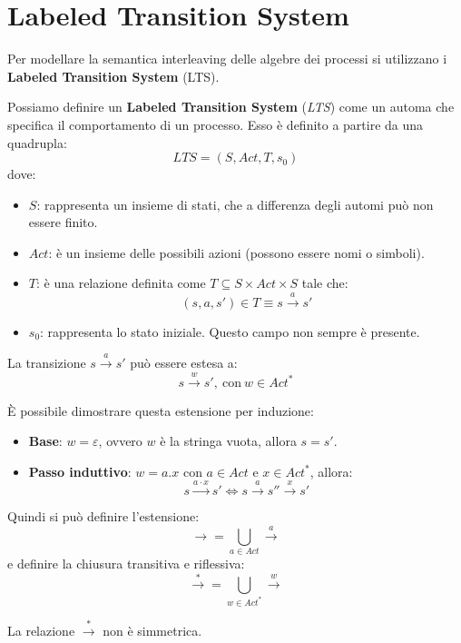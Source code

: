 \section{Labeled Transition System}
Per modellare la semantica interleaving delle algebre dei processi si utilizzano
i \textbf{Labeled Transition System} (LTS).
\begin{definizione}
    Possiamo definire un \textbf{Labeled Transition System} (\textit{LTS}) come
    un automa che specifica il comportamento di un processo. Esso è definito a
    partire da una quadrupla:
    \begin{equation}
        LTS = (S, Act, T, s_0)
    \end{equation}
    dove:
    \begin{itemize}
        \item \textbf{$S$}: rappresenta un insieme di stati, che a differenza
              degli automi può non essere finito.
        \item \textbf{$Act$}: è un insieme delle possibili azioni (possono essere
              nomi o simboli).
        \item \textbf{$T$}: è una relazione definita come
              $T \subseteq S \times Act \times S$ tale che:
              $$(s, a, s') \in T \equiv s \xrightarrow{a} s'$$
        \item \textbf{$s_0$}: rappresenta lo stato iniziale. Questo campo non
              sempre è presente.
    \end{itemize}
\end{definizione}
La transizione $s \xrightarrow{a} s'$ può essere estesa a:
\begin{equation}
    s \xrightarrow{w} s', \ \text{con} \ w \in Act^*
\end{equation}
\begin{dimostrazione}
    È possibile dimostrare questa estensione per induzione:
    \begin{itemize}
        \item \textbf{Base}: $w = \varepsilon$, ovvero $w$ è la stringa vuota,
              allora $s = s'$.
        \item \textbf{Passo induttivo}: $w = a . x$ con $a \in Act$ e
              $x \in Act^*$, allora:
              \begin{equation}
                  s \xrightarrow{a\cdot x} s' \iff s \xrightarrow{a} s''
                  \xrightarrow{x} s'
              \end{equation}
    \end{itemize}
\end{dimostrazione}
Quindi si può definire l'estensione:
\begin{equation}
    \xrightarrow{}  = \bigcup_{a \in Act} \xrightarrow{a}
\end{equation}
e definire la chiusura transitiva e riflessiva:
\begin{equation}
    \xrightarrow{\ast}  = \bigcup_{w \in Act^{\ast}} \xrightarrow{w}
\end{equation}
\begin{nota}
    La relazione $\xrightarrow{\ast}$ non è simmetrica.
\end{nota}
